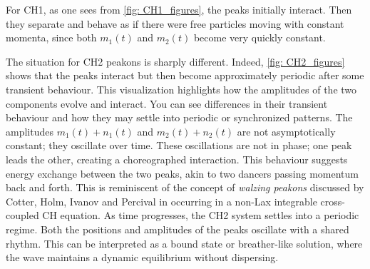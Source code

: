 \documentclass[10pt,a4paper]{article}
\numberwithin{equation}{section}
\theoremstyle{plain}
\theoremstyle{definition}
\begin{document}
For CH1, as one sees from \autoref{fig: CH1_figures}, the peaks initially interact. Then they separate and behave as if there were free particles moving with constant momenta, since both $m_1(t)$ and $m_2(t)$ become very quickly constant.  

The situation for CH2 peakons is sharply different.  Indeed, \autoref{fig: CH2_figures} 
shows that the peaks interact but then become approximately periodic after some transient behaviour.  This visualization highlights how the amplitudes of the two components evolve and interact. You can see differences in their transient behaviour and how they may settle into periodic or synchronized patterns.  The amplitudes \( m_1(t) + n_1(t) \) and \( m_2(t) + n_2(t) \) are not asymptotically constant; they oscillate over time. These oscillations are not in phase; one peak leads the other, creating a choreographed interaction. This behaviour suggests energy exchange between the two peaks, akin to two dancers passing momentum back and forth.  This is reminiscent of the concept of 
\emph{walzing peakons} discussed by Cotter, Holm, Ivanov and Percival in  \cite{Holm:Waltzing} occurring in a non-Lax integrable cross-coupled CH equation.  As time progresses, the CH2 system settles into a periodic regime. Both the positions and amplitudes of the peaks oscillate with a shared rhythm. This can be interpreted as a bound state or breather-like solution, where the wave maintains a dynamic equilibrium without dispersing.
\end{document}
